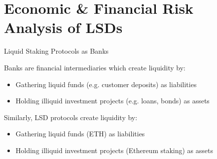 \documentclass{beamer}
\begin{document}
\section[Economic Analysis]{Economic \& Financial Risk Analysis of LSDs}
\begin{frame}{Liquid Staking Protocols as Banks}

    \footnotemark Banks are financial intermediaries which create liquidity by:

    \begin{itemize}
        \item Gathering liquid funds (e.g. customer deposits) as liabilities
        \item Holding illiquid investment projects (e.g. loans, bonds) as assets
    \end{itemize}
    \bigskip
    Similarly, LSD protocols create liquidity by:
    \begin{itemize}
        \item Gathering liquid funds (ETH) as liabilities
        \item Holding illiquid investment projects (Ethereum staking) as assets
    \end{itemize}


\end{frame}

    
\end{document}
